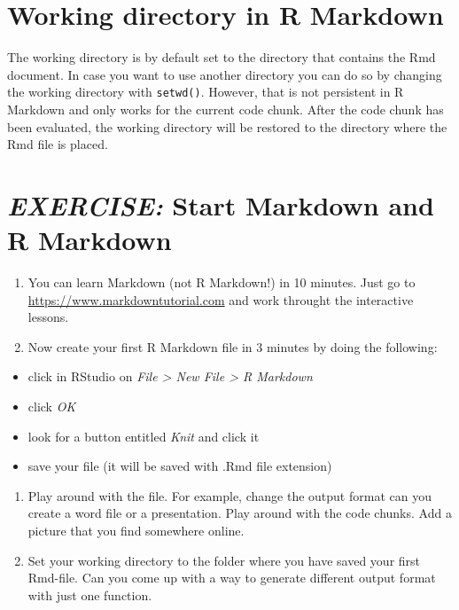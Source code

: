 \documentclass[
  12pt,
  oneside]{book}
\providecommand{\tightlist}{%
  \setlength{\itemsep}{0pt}\setlength{\parskip}{0pt}}
\begin{document}
\hypertarget{working-directory-in-r-markdown}{%
\section{Working directory in R Markdown}\label{working-directory-in-r-markdown}}

The working directory is by default set to the directory that contains the Rmd document. In case you want to use another directory you can do so by changing the working directory with \texttt{setwd()}. However, that is not persistent in R Markdown and only works for the current code chunk. After the code chunk has been evaluated, the working directory will be restored to the directory where the Rmd file is placed.

\hypertarget{exercise-start-markdown-and-r-markdown}{%
\section*{\texorpdfstring{\emph{EXERCISE:} Start Markdown and R Markdown}{EXERCISE: Start Markdown and R Markdown}}\label{exercise-start-markdown-and-r-markdown}}

\begin{enumerate}
\def\labelenumi{\alph{enumi})}
\tightlist
\item
  You can learn Markdown (not R Markdown!) in 10 minutes. Just go to \url{https://www.markdowntutorial.com} and work throught the interactive lessons.
\item
  Now create your first R Markdown file in 3 minutes by doing the following:
\end{enumerate}

\begin{itemize}
\tightlist
\item
  click in RStudio on \emph{File \textgreater{} New File \textgreater{} R Markdown}
\item
  click \emph{OK}
\item
  look for a button entitled \emph{Knit} and click it
\item
  save your file (it will be saved with .Rmd file extension)
\end{itemize}

\begin{enumerate}
\def\labelenumi{\alph{enumi})}
\setcounter{enumi}{2}
\tightlist
\item
  Play around with the file. For example, change the output format can you create a word file or a presentation. Play around with the code chunks. Add a picture that you find somewhere online.
\item
  Set your working directory to the folder where you have saved your first Rmd-file. Can you come up with a way to generate different output format with just one function.
\end{enumerate}
\end{document}
